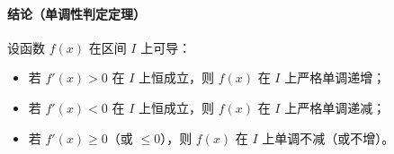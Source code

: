 \paragraph{结论（单调性判定定理）}

设函数 $f(x)$ 在区间 $I$ 上可导：
\begin{itemize}
  \item 若 $f'(x) > 0$ 在 $I$ 上恒成立，则 $f(x)$ 在 $I$ 上严格单调递增；
  \item 若 $f'(x) < 0$ 在 $I$ 上恒成立，则 $f(x)$ 在 $I$ 上严格单调递减；
  \item 若 $f'(x) \ge 0$（或 $\le 0$），则 $f(x)$ 在 $I$ 上单调不减（或不增）。
\end{itemize}
